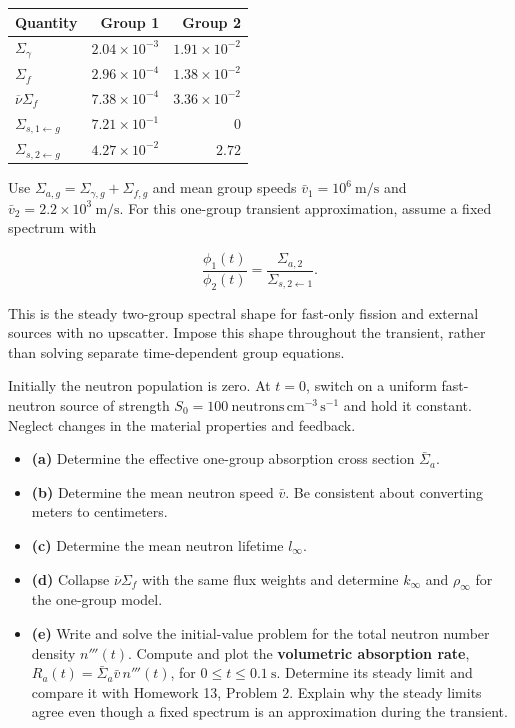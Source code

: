 \begin{longtable}[]{@{}lrr@{}}
\toprule\noalign{}
Quantity & Group 1 & Group 2 \\
\midrule\noalign{}
\endhead
\bottomrule\noalign{}
\endlastfoot
\(\Sigma_\gamma\) & \(2.04\times10^{-3}\) & \(1.91\times10^{-2}\) \\
\(\Sigma_f\) & \(2.96\times10^{-4}\) & \(1.38\times10^{-2}\) \\
\(\overline\nu\Sigma_f\) & \(7.38\times10^{-4}\) &
\(3.36\times10^{-2}\) \\
\(\Sigma_{s,1\gets g}\) & \(7.21\times10^{-1}\) & \(0\) \\
\(\Sigma_{s,2\gets g}\) & \(4.27\times10^{-2}\) & \(2.72\) \\
\end{longtable}

Use \(\Sigma_{a,g}=\Sigma_{\gamma,g}+\Sigma_{f,g}\) and mean group
speeds \(\bar v_1=10^6~\mathrm{m/s}\) and
\(\bar v_2=2.2\times10^3~\mathrm{m/s}\). For this one-group transient
approximation, assume a fixed spectrum with

\[
\frac{\phi_1(t)}{\phi_2(t)}
=\frac{\Sigma_{a,2}}{\Sigma_{s,2\gets1}}.
\]

This is the steady two-group spectral shape for fast-only fission and
external sources with no upscatter. Impose this shape throughout the
transient, rather than solving separate time-dependent group equations.

Initially the neutron population is zero. At \(t=0\), switch on a
uniform fast-neutron source of strength
\(S_0=100~\mathrm{neutrons\,cm^{-3}\,s^{-1}}\) and hold it constant.
Neglect changes in the material properties and feedback.

\begin{itemize}
\setlength{\itemsep}{0pt}\setlength{\parskip}{0pt}
\item
  \textbf{(a)} Determine the effective one-group absorption cross
  section \(\bar\Sigma_a\).
\item
  \textbf{(b)} Determine the mean neutron speed \(\bar v\). Be
  consistent about converting meters to centimeters.
\item
  \textbf{(c)} Determine the mean neutron lifetime \(l_\infty\).
\item
  \textbf{(d)} Collapse \(\overline\nu\Sigma_f\) with the same flux
  weights and determine \(k_\infty\) and \(\rho_\infty\) for the
  one-group model.
\item
  \textbf{(e)} Write and solve the initial-value problem for the total
  neutron number density \(n'''(t)\). Compute and plot the
  \textbf{volumetric absorption rate},
  \(R_a(t)=\bar\Sigma_a\bar v\,n'''(t)\), for
  \(0\le t\le0.1~\mathrm{s}\). Determine its steady limit and compare it
  with Homework 13, Problem 2. Explain why the steady limits agree even
  though a fixed spectrum is an approximation during the transient.
\end{itemize}


